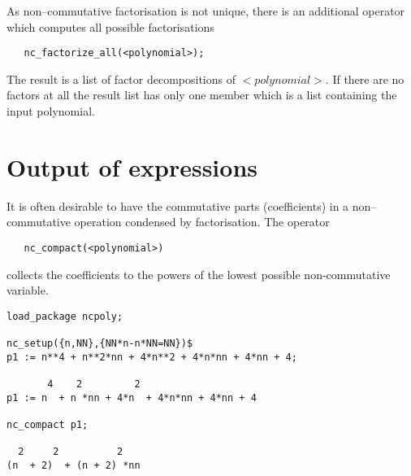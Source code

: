 As non--commutative factorisation is not unique, there is
an additional operator which computes all possible
factorisations
\begin{verbatim}
   nc_factorize_all(<polynomial>);
\end{verbatim}
The result is a list of factor decompositions of $<polynomial>$.
If there are no factors at all the result list has only one
member which is a list containing the input polynomial.

\section{Output of expressions}

It is often desirable to have the commutative parts (coefficients)
in a non--commutative operation condensed by factorisation. The
operator
\begin{verbatim}
   nc_compact(<polynomial>)
\end{verbatim}
collects the coefficients to the powers of the lowest possible
non-commutative variable.
\begin{verbatim}
load_package ncpoly;

nc_setup({n,NN},{NN*n-n*NN=NN})$
p1 := n**4 + n**2*nn + 4*n**2 + 4*n*nn + 4*nn + 4;

       4    2         2
p1 := n  + n *nn + 4*n  + 4*n*nn + 4*nn + 4

nc_compact p1;

  2     2          2
(n  + 2)  + (n + 2) *nn

\end{verbatim}

